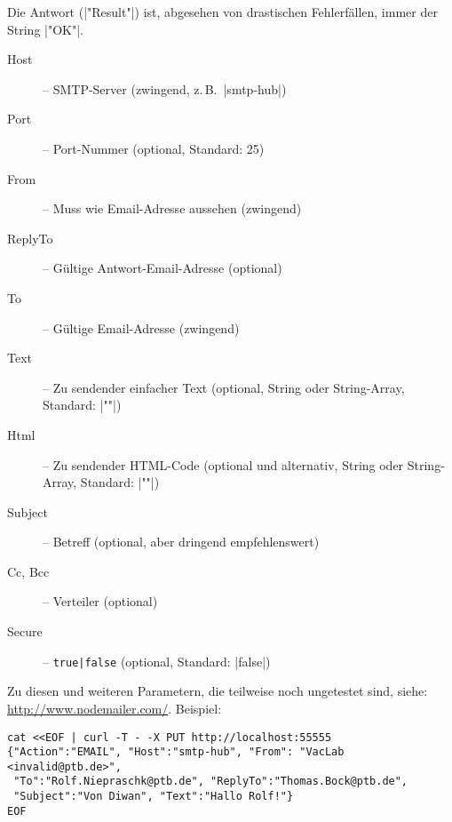 \documentclass[titlepage=false,toc=nobibliography]{vl-report}
\newcommand*\action[1]{\fbox{\nolinkurl{#1}}\medskip\par}
\begin{document}
\begin{description}
\begin{description}
\begin{description}
      \end{description}

      \noindent Die Antwort (|"Result"|) ist, abgesehen von drastischen
      Fehlerfällen, immer der String |"OK"|.

    \item \action{EMAIL}

      \begin{description}

        \item[Host] -- SMTP-Server (zwingend, z.\,B.\ |smtp-hub|)

        \item[Port] -- Port-Nummer (optional, Standard: 25)

        \item[From] -- Muss wie Email-Adresse aussehen (zwingend)
        
        \item[ReplyTo] -- Gültige Antwort-Email-Adresse (optional)

        \item[To] -- Gültige Email-Adresse (zwingend)

        \item[Text] -- Zu sendender einfacher Text (optional, 
          String oder String-Array, Standard: |""|)
        
        \item[Html] -- Zu sendender HTML-Code (optional und alternativ, 
          String oder String-Array, Standard: |""|)
        
        \item[Subject] -- Betreff (optional, aber dringend empfehlenswert)

        \item[Cc, Bcc] -- Verteiler (optional)
        
        \item[Secure] -- \verb+true|false+ (optional, Standard: |false|)

      \end{description}

      \noindent Zu diesen und weiteren Parametern, die teilweise noch ungetestet 
      sind, siehe: \url{http://www.nodemailer.com/}. Beispiel:
\begin{lstlisting}[language={}]
cat <<EOF | curl -T - -X PUT http://localhost:55555
{"Action":"EMAIL", "Host":"smtp-hub", "From": "VacLab <invalid@ptb.de>", 
 "To":"Rolf.Niepraschk@ptb.de", "ReplyTo":"Thomas.Bock@ptb.de",
 "Subject":"Von Diwan", "Text":"Hallo Rolf!"}
EOF
\end{lstlisting}


\end{description}
\end{description}
\end{document}
